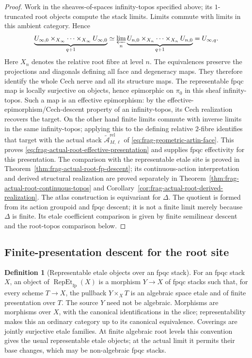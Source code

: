 \documentclass[11pt]{article}
\theoremstyle{definition}
\newtheorem{definition}[theorem]{Definition}
\theoremstyle{remark}
\begin{document}
\begin{proof}
Work in the sheaves-of-spaces infinity-topos specified above; its
$1$-truncated root objects compute the stack limits.  Limits commute
with limits in this ambient category.  Hence
\[
 \underbrace{U_{\infty,0}\times_{X_\infty}\cdots
                 \times_{X_\infty}U_{\infty,0}}_{q+1}
 \simeq\varprojlim_n
 \underbrace{U_{n,0}\times_{X_n}\cdots\times_{X_n}U_{n,0}}_{q+1}
 =U_{\infty,q}.
\]
Here $X_n$ denotes the relative root fibre at level $n$.
The equivalences preserve the projections and diagonals defining
all face and degeneracy maps.  They therefore identify the whole
Cech nerve and all its structure maps.  The representable fpqc map is locally surjective on objects, hence
epimorphic on $\pi_0$ in this sheaf infinity-topos.  Such a map is
an effective epimorphism: by the effective-epimorphism/Cech-descent
property of an infinity-topos, its Cech realization recovers the target.
On the other hand finite limits commute with inverse limits in the same
infinity-topos; applying this to the defining relative $2$-fibre identifies
that target with the actual stack
$\widetilde{\mathcal A}_{M,\ell}^{\mathrm{rel}}$ of
\eqref{eq:frag-geometric-artin-face}.  This proves
\eqref{eq:frag-actual-root-effective-presentation} and supplies fpqc effectivity for this presentation.  The comparison with
the representable etale site is proved in
Theorem~\ref{thm:frag-actual-root-fp-descent}; its continuous-action
interpretation and derived structural realization are proved separately in
Theorem~\ref{thm:frag-actual-root-continuous-topos} and
Corollary~\ref{cor:frag-actual-root-derived-realization}.
The atlas construction is equivariant for $\Delta$.  The quotient is
formed from its action groupoid and fpqc descent; it is not a finite limit
merely because $\Delta$ is finite.  Its etale coefficient comparison is
given by finite semilinear descent and the root-topos comparison below.
\end{proof}

\subsection{Finite-presentation descent for the root site}

\begin{definition}[Representable etale objects over an fpqc stack]
\label{def:frag-actual-repet-sources}
For an fpqc stack $X$, an object of $\operatorname{RepEt}_{\mathrm{fp}}(X)$
is a morphism $Y\to X$ of fpqc stacks such that, for every scheme
$T\to X$, the pullback $Y\times_XT$ is an algebraic space etale and
of finite presentation over $T$.  The source $Y$ need not be algebraic.
Morphisms are morphisms over $X$, with the canonical identifications
in the slice; representability makes this an ordinary category up to
its canonical equivalence.  Coverings are jointly surjective etale
families.  At finite algebraic root levels this convention gives the
usual representable etale objects; at the actual limit it permits
their base changes, which may be non-algebraic fpqc stacks.
\end{definition}
\end{document}
